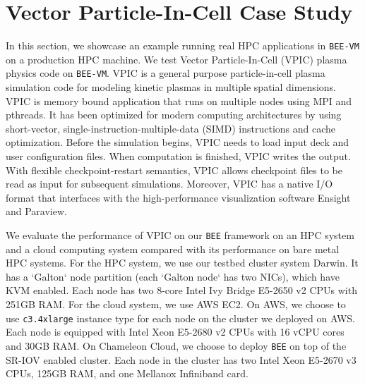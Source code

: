 \section{Vector Particle-In-Cell Case Study}
  \label{sec:case_study}
  In this section, we showcase an example running real HPC applications in \texttt{BEE-VM} on a production HPC machine. We test Vector Particle-In-Cell (VPIC) plasma physics code \cite{bowers20080, bowers2008ultrahigh, bowers2009advances} on \texttt{BEE-VM}. VPIC is a general purpose particle-in-cell plasma simulation code for modeling kinetic plasmas in multiple spatial dimensions. VPIC is memory bound application that runs on multiple nodes using MPI and pthreads. It has been optimized for modern computing architectures by using short-vector, single-instruction-multiple-data (SIMD) instructions and cache optimization. Before the simulation begins, VPIC needs to load input deck and user configuration files. When computation is finished, VPIC writes the output. With flexible checkpoint-restart semantics,  VPIC allows checkpoint files to be read as input for subsequent simulations. Moreover, VPIC has a native I/O format that interfaces with the high-performance visualization software Ensight and Paraview. 

We evaluate the performance of VPIC on our \texttt{BEE} framework on an HPC system and a cloud computing system compared with its performance on bare metal HPC systems. For the HPC system, we use our testbed cluster system Darwin. It has a `Galton` node partition (each `Galton node` has two NICs), which have KVM enabled. Each node has two 8-core Intel Ivy Bridge E5-2650 v2 CPUs with 251GB RAM. For the cloud  system, we use AWS EC2. On AWS, we choose to use \texttt{c3.4xlarge} instance type for each node on the cluster we deployed on AWS. Each node is equipped with Intel Xeon E5-2680 v2 CPUs with 16 vCPU cores and 30GB RAM. On Chameleon Cloud, we choose to deploy \texttt{BEE} on top of the SR-IOV enabled cluster. Each node in the cluster has two Intel Xeon E5-2670 v3 CPUs, 125GB RAM, and one Mellanox Infiniband card.


